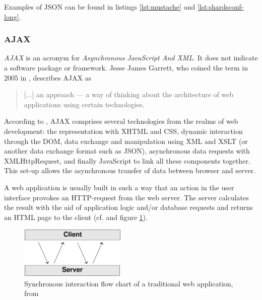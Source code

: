 Examples of JSON can be found in listings \ref{lst:mustache} and \ref{lst:shardsconf-long}.

\subsubsection{AJAX}
\label{subsec:ajax}

\textit{AJAX} is an acronym for \textit{Asynchronous JavaScript And XML}. It does not indicate a software package or framework. Jesse James Garrett, who coined the term in 2005 in \cite{ajax:approach}, describes AJAX as

\begin{quote}
[...] an approach — a way of thinking about the architecture of web applications using certain technologies.
\end{quote}

According to \cite{ajax:approach}, AJAX comprises several technologies from the realms of web development: the representation with XHTML and CSS, dynamic interaction through the DOM, data exchange and manipulation using XML and XSLT (or another data exchange format such as JSON), asynchronous data requests with XMLHttpRequest, and finally JavaScript to link all these components together. This set-up allows the asynchronous transfer of data between browser and server.

A web application is usually built in such a way that an action in the user interface provokes an HTTP-request from the web server. The server calculates the result with the aid of application logic and/or database requests and returns an HTML page to the client (cf. \cite{ajax:approach} and figure \ref{fig:classic-interaction-pattern}).

\medskip
\begin{figure}[ht] 
 \begin{center}
   \includegraphics[width=0.45\textwidth]{grafik/ajax-classic} 
 \end{center}
 \caption[Synchronous interaction flow chart of a traditional web application]{Synchronous interaction flow chart of a traditional web application, from }
 \label{fig:classic-interaction-pattern} 
\end{figure}

